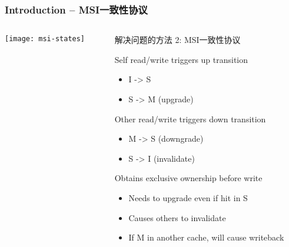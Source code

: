\begin{frame}[plain]	
	\frametitle{Introduction -- MSI一致性协议}
	
	
	\begin{columns}
		
		\begin{column}{.4\textwidth}
			\texttt{[image: msi-states]}
		\end{column}
		\begin{column}{.6\textwidth}
			解决问题的方法 2: MSI一致性协议
			
			Self read/write triggers up transition
			\begin{itemize}
				\item  I -> S				
				\item  S -> M (upgrade)				
			\end{itemize}
			Other read/write triggers down transition
			\begin{itemize}
				\item  M -> S (downgrade)			
				\item  S -> I (invalidate)				
			\end{itemize}			
			Obtains exclusive ownership before write
			\begin{itemize}
				\item  Needs to upgrade even if hit in S			
				\item Causes others to invalidate
				\item If M in another cache, will cause writeback

			\end{itemize}					
		\end{column}
	\end{columns}
	
\end{frame}

